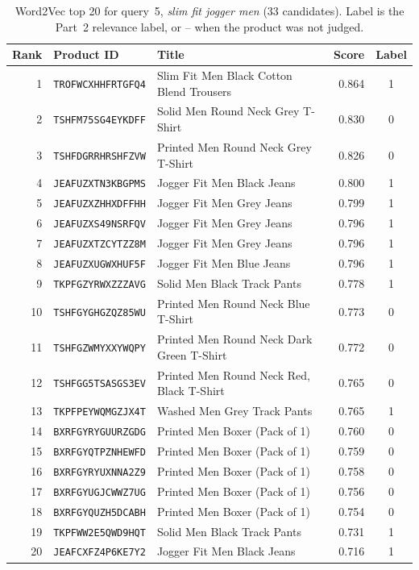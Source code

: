 \documentclass[11pt,a4paper]{article}
\begin{document}
\begin{table}[htbp]
  \centering
  \small
  \caption{Word2Vec top 20 for query~5, \emph{slim fit jogger men} (33 candidates). Label is
  the Part~2 relevance label, or -- when the product was not judged.}
  \label{tab:w2v-q5}
  \begin{tabular}{rlp{7.2cm}rc}
    \toprule
    Rank & Product ID & Title & Score & Label \\
    \midrule
    1 & \texttt{TROFWCXHHFRTGFQ4} & Slim Fit Men Black Cotton Blend Trousers & 0.864 & 1 \\
    2 & \texttt{TSHFM75SG4EYKDFF} & Solid Men Round Neck Grey T-Shirt & 0.830 & 0 \\
    3 & \texttt{TSHFDGRRHRSHFZVW} & Printed Men Round Neck Grey T-Shirt & 0.826 & 0 \\
    4 & \texttt{JEAFUZXTN3KBGPMS} & Jogger Fit Men Black Jeans & 0.800 & 1 \\
    5 & \texttt{JEAFUZXZHHXDFFHH} & Jogger Fit Men Grey Jeans & 0.799 & 1 \\
    6 & \texttt{JEAFUZXS49NSRFQV} & Jogger Fit Men Grey Jeans & 0.796 & 1 \\
    7 & \texttt{JEAFUZXTZCYTZZ8M} & Jogger Fit Men Grey Jeans & 0.796 & 1 \\
    8 & \texttt{JEAFUZXUGWXHUF5F} & Jogger Fit Men Blue Jeans & 0.796 & 1 \\
    9 & \texttt{TKPFGZYRWXZZZAVG} & Solid Men Black Track Pants & 0.778 & 1 \\
    10 & \texttt{TSHFGYGHGZQZ85WU} & Printed Men Round Neck Blue T-Shirt & 0.773 & 0 \\
    11 & \texttt{TSHFGZWMYXXYWQPY} & Printed Men Round Neck Dark Green T-Shirt & 0.772 & 0 \\
    12 & \texttt{TSHFGG5TSASGS3EV} & Printed Men Round Neck Red, Black T-Shirt & 0.765 & 0 \\
    13 & \texttt{TKPFPEYWQMGZJX4T} & Washed Men Grey Track Pants & 0.765 & 1 \\
    14 & \texttt{BXRFGYRYGUURZGDG} & Printed Men Boxer (Pack of 1) & 0.760 & 0 \\
    15 & \texttt{BXRFGYQTPZNHEWFD} & Printed Men Boxer (Pack of 1) & 0.759 & 0 \\
    16 & \texttt{BXRFGYRYUXNNA2Z9} & Printed Men Boxer (Pack of 1) & 0.758 & 0 \\
    17 & \texttt{BXRFGYUGJCWWZ7UG} & Printed Men Boxer (Pack of 1) & 0.756 & 0 \\
    18 & \texttt{BXRFGYQUZH5DCABH} & Printed Men Boxer (Pack of 1) & 0.754 & 0 \\
    19 & \texttt{TKPFWW2E5QWD9HQT} & Solid Men Black Track Pants & 0.731 & 1 \\
    20 & \texttt{JEAFCXFZ4P6KE7Y2} & Jogger Fit Men Black Jeans & 0.716 & 1 \\
    \bottomrule
  \end{tabular}
\end{table}
\end{document}
